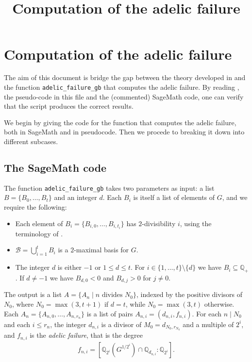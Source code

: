 \documentclass[10pt,a4paper]{report}
\title{Computation of the adelic failure}
\theoremstyle{definition}
\begin{document}
\chapter*{Computation of the adelic failure}

The aim of this document is bridge the gap between the theory developed in \cite{PST1} and the function \texttt{adelic\_failure\_gb} that computes the adelic failure. By reading \cite{PST1}, the pseudo-code in this file and the (commented) SageMath code, one can verify that the script produces the correct results.

We begin by giving the code for the function that computes the adelic failure, both in SageMath and in pseudocode. Then we procede to breaking it down into different subcases.

\section*{The SageMath code}

The function \texttt{adelic\_failure\_gb} takes two parameters as input: a list $B=\{B_0,\dots, B_t\}$ and an integer $d$. Each $B_i$ is itself a list of elements of $G$, and we require the following:
\begin{itemize}
\item Each element of $B_i=\{B_{i,0},\dots,B_{i,t_i}\}$ has $2$-divisibility $i$, using the terminology of \cite{DebryPerucca}.
\item $\mathcal{B}=\bigcup_{i=1}^t B_i$ is a $2$-maximal basis for $G$.
\item The integer $d$ is either $-1$ or $1\leq d\leq t$. For $i\in\{1,\dots,t\}\setminus\{d\}$ we have $B_i\subseteq \mathbb{Q}_+$. If $d\neq -1$ we have $B_{d,0}<0$ and $B_{d,j}>0$ for $j\neq 0$.
\end{itemize}
The output is a list $A=\{A_n\mid n\text{ divides }N_0\}$, indexed by the positive divisors of $N_0$, where $N_0=\max(3,t+1)$ if $d=t$, while $N_0=\max(3,t)$ otherwise. Each $A_n=\{A_{n,0},\dots,A_{n,r_n}\}$ is a list of pairs $A_{n,i}=(d_{n,i},f_{n,i})$. For each $n\mid N_0$ and each $i\leq r_n$, the integer $d_{n,i}$ is a divisor of $M_0=d_{N_0,r_{N_0}}$ and a multiple of $2^i$, and $f_{n,i}$ is the \emph{adelic failure}, that is the degree
\begin{align*}
f_{n,i}=\left[\mathbb{Q}_{2^i}\left(G^{1/2^i}\right)\cap \mathbb{Q}_{d_{n,i}}:\mathbb{Q}_{2^i}\right].
\end{align*}
\end{document}
